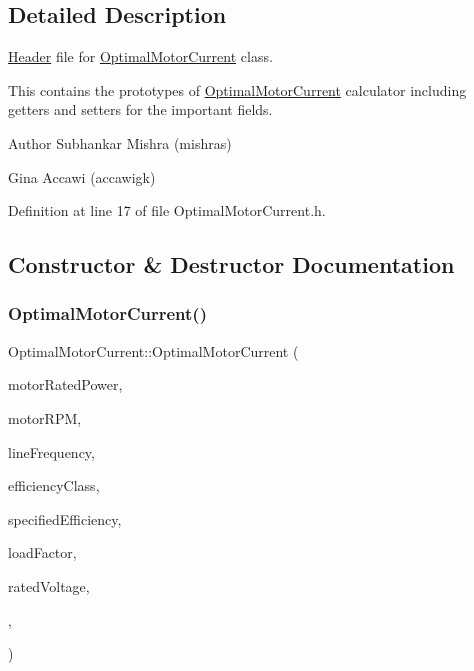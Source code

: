 \subsection{Detailed Description}
\hyperlink{class_header}{Header} file for \hyperlink{class_optimal_motor_current}{Optimal\+Motor\+Current} class. 

This contains the prototypes of \hyperlink{class_optimal_motor_current}{Optimal\+Motor\+Current} calculator including getters and setters for the important fields.

\begin{DoxyAuthor}{Author}
Subhankar Mishra (mishras) 

Gina Accawi (accawigk) 
\end{DoxyAuthor}


Definition at line 17 of file Optimal\+Motor\+Current.\+h.



\subsection{Constructor \& Destructor Documentation}
\mbox{\label{class_optimal_motor_current_a6e88ae5d7005b9790810de4f8892ba15}} 
\subsubsection{\texorpdfstring{Optimal\+Motor\+Current()}{OptimalMotorCurrent()}}
{\footnotesize\ttfamily Optimal\+Motor\+Current\+::\+Optimal\+Motor\+Current (\begin{DoxyParamCaption}\item[{double}]{motor\+Rated\+Power,  }\item[{int}]{motor\+R\+PM,  }\item[{\hyperlink{class_motor_acee1bdf1b684ad36cb80dc2829d9fcee}{Motor\+::\+Line\+Frequency}}]{line\+Frequency,  }\item[{\hyperlink{class_motor_afa022971ae062406a9f588c601673d4e}{Motor\+::\+Efficiency\+Class}}]{efficiency\+Class,  }\item[{double}]{specified\+Efficiency,  }\item[{double}]{load\+Factor,  }\item[{double}]{rated\+Voltage,  }\item[{double}]{,  }\item[{double}]{ }\end{DoxyParamCaption})\hspace{0.3cm}{\ttfamily [inline]}}

